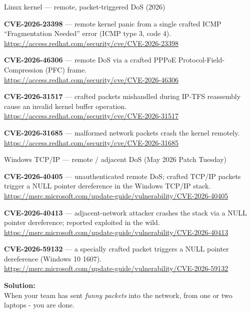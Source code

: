 \documentclass[a4paper,11pt,notitlepage]{report}
\begin{document}
Linux kernel --- remote, packet-triggered DoS (2026)
\begin{list2}
\item \textbf{CVE-2026-23398} --- remote kernel panic from a single
      crafted ICMP ``Fragmentation Needed'' error (ICMP type 3,
      code 4).\\
      \url{https://access.redhat.com/security/cve/CVE-2026-23398}
\item \textbf{CVE-2026-46306} --- remote DoS via a crafted PPPoE
      Protocol-Field-Compression (PFC) frame.\\
      \url{https://access.redhat.com/security/cve/CVE-2026-46306}
\item \textbf{CVE-2026-31517} --- crafted packets mishandled during
      IP-TFS reassembly cause an invalid kernel buffer operation.\\
      \url{https://access.redhat.com/security/cve/CVE-2026-31517}
\item \textbf{CVE-2026-31685} --- malformed network packets crash the
      kernel remotely.\\
      \url{https://access.redhat.com/security/cve/CVE-2026-31685}
\end{list2}

Windows TCP/IP --- remote / adjacent DoS (May 2026 Patch Tuesday)
\begin{list2}
\item \textbf{CVE-2026-40405} --- unauthenticated remote DoS; crafted
      TCP/IP packets trigger a NULL pointer dereference in the
      Windows TCP/IP stack.\\
      \url{https://msrc.microsoft.com/update-guide/vulnerability/CVE-2026-40405}

\item \textbf{CVE-2026-40413} --- adjacent-network attacker crashes the
      stack via a NULL pointer dereference; reported exploited in the
      wild.\\
      \url{https://msrc.microsoft.com/update-guide/vulnerability/CVE-2026-40413}
\item \textbf{CVE-2026-59132} --- a specially crafted packet triggers a
      NULL pointer dereference (Windows 10 1607).\\
      \url{https://msrc.microsoft.com/update-guide/vulnerability/CVE-2026-59132}
\end{list2}

{\bf Solution:}\\
When your team has sent \emph{funny packets} into the network, from one or two laptops - you are done.
\end{document}
